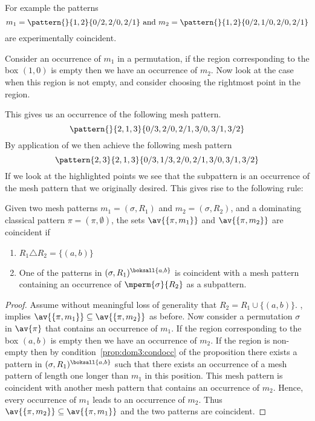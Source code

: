 For example the patterns
\begin{equation*}
    m_1 = \pattern{}{1,2}{0/2,2/0,2/1} \text{ and } m_2 = \pattern{}{1,2}{0/2,1/0,2/0,2/1}
\end{equation*}
are experimentally coincident.

Consider an occurrence of \(m_1\) in a permutation, if the region corresponding
to the box \((1,0)\) is empty then we have an occurrence of \(m_2\). Now look at
the case when this region is not empty, and consider choosing the rightmost
point in the region.

This gives us an occurrence of the following mesh pattern.
\begin{equation*}
    \pattern{}{2,1,3}{0/3,2/0,2/1,3/0,3/1,3/2}
\end{equation*}
By application of  we then achieve the following
mesh pattern
\begin{equation*}
    \pattern{2,3}{2,1,3}{0/3,1/3,2/0,2/1,3/0,3/1,3/2}
\end{equation*}
If we look at the highlighted points we see that the subpattern is an occurrence
of the mesh pattern that we originally desired. This gives rise to the following
rule:

\begin{proposition}
    \label{prop:dom3}
    Given two mesh patterns \(m_1 =(\sigma, R_1)\) and \(m_2 = (\sigma, R_2)\),
    and a dominating classical pattern \(\pi = (\pi,\emptyset)\), the sets
    \(\av{\{\pi,m_1\}}\) and \(\av{\{\pi,m_2\}}\) are coincident if
    \begin{enumerate}
        \item \(R_1 \triangle R_2 = \{(a,b)\}\)
        \item\label{prop:dom3:condocc} One of the patterns in \((\sigma,R_1)^\boksall{a,b}\)
            is coincident with a mesh pattern containing an occurrence of
            \(\mperm{\sigma}{R_2}\) as a subpattern.
    \end{enumerate}
\end{proposition}
\begin{proof}
    Assume without meaningful loss of generality that \(R_2 = R_1 \cup \{(a,b)\}\).
    , implies \(\av{\{\pi,m_1\}} \subseteq \av{\{\pi,m_2\}}\) as before.
    Now consider a permutation \(\sigma\) in \(\av{\pi}\) that contains an
    occurrence of \(m_1\). If the region corresponding to the box \((a,b)\)
    is empty then we have an occurrence of \(m_2\). If the region is non-empty
    then by condition~\ref{prop:dom3:condocc}  of the proposition there exists
    a pattern in \((\sigma,R_1)^\boksall{a,b}\) such that there exists an occurrence of a mesh pattern of
    length one longer than \(m_1\) in this position. This mesh pattern is
    coincident with another mesh pattern that contains an
    occurrence of \(m_2\). Hence, every occurrence of \(m_1\) leads to an occurrence
    of \(m_2\).  Thus \(\av{\{\pi,m_2\}} \subseteq \av{\{\pi,m_1\}}\) and the
    two patterns are coincident.
\end{proof}

